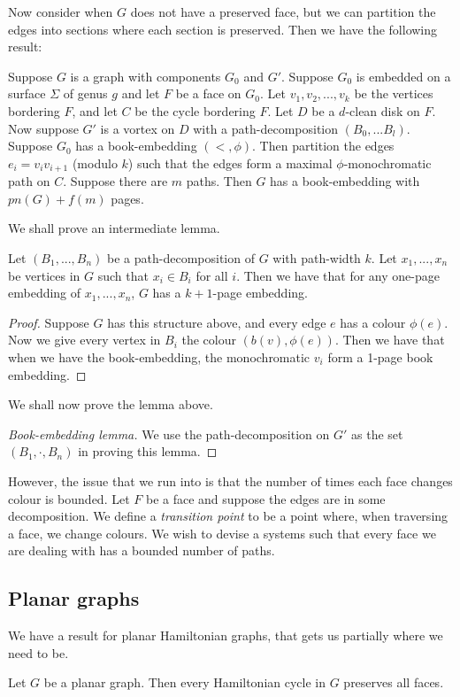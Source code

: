 Now consider when $G$ does not have a preserved face, but we can partition the edges into sections where each section is preserved. Then we have the following result:
\begin{lemma}
	Suppose $G$ is a graph with components $G_0$ and $G'$. Suppose $G_0$ is embedded on a surface $\Sigma$ of genus $g$ and let $F$ be a face on $G_0$. Let $v_1, v_2, ..., v_k$ be the vertices bordering $F$, and let $C$ be the cycle bordering $F$. Let $D$ be a $d$-clean disk on $F$. Now suppose $G'$ is a vortex on $D$ with a path-decomposition $(B_0, ... B_l)$. Suppose $G_0$ has a book-embedding $(<, \phi)$. Then partition the edges $e_i = v_i v_{i + 1}$ (modulo $k$) such that the edges form a maximal $\phi$-monochromatic path on $C$. Suppose there are $m$ paths. Then $G$ has a book-embedding with $pn(G) + f(m)$ pages.
\end{lemma}
We shall prove an intermediate lemma. 
\begin{lemma}
	Let $(B_1, ..., B_n)$ be a path-decomposition of $G$ with path-width $k$. Let $x_1, ..., x_n$ be vertices in $G$ such that $x_i \in B_i$ for all $i$. Then we have that for any one-page embedding of $x_1, ..., x_n$, $G$ has a $k + 1$-page embedding. 
\end{lemma}
\begin{proof}
	Suppose $G$ has this structure above, and every edge $e$ has a colour $\phi(e)$. 
	Now we give every vertex in $B_i$ the colour $(b(v),  \phi(e))$. Then we have that when we have the book-embedding, the monochromatic $v_i$ form a 1-page book embedding.
\end{proof}

We shall now prove the lemma above.
\begin{proof}[Book-embedding lemma]
	We use the path-decomposition on $G'$ as the set $(B_1, \cdot , B_n)$ in proving this lemma. 
\end{proof}


However, the issue that we run into is that the number of times each face changes colour is bounded. Let $F$ be a face and suppose the edges are in some decomposition. We define a \textit{transition point} to be a point where, when traversing a face, we change colours. We wish to devise a systems such that every face we are dealing with has a bounded number of paths.


\subsection{Planar graphs}
We have a result for planar Hamiltonian graphs, that gets us partially where we need to be. 
\begin{theorem}
	Let $G$ be a planar graph. Then every Hamiltonian cycle in $G$ preserves all faces. 
\end{theorem}

